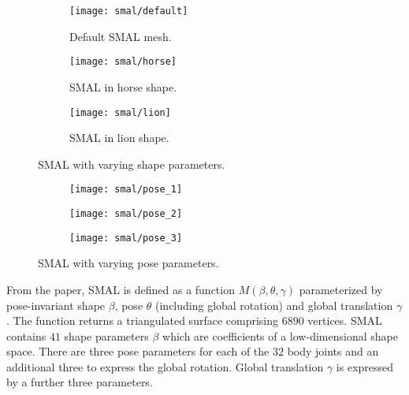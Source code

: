 \begin{figure}[H]
    \centering
    \begin{subfigure}{0.3\linewidth}
    \centering
        \texttt{[image: smal/default]}
        \caption{Default SMAL mesh.}
    \end{subfigure}%
    \begin{subfigure}{0.3\linewidth}
    \centering
        \texttt{[image: smal/horse]}
        \caption{SMAL in horse shape.}
    \end{subfigure}%
    \begin{subfigure}{0.3\linewidth}
        \centering
            \texttt{[image: smal/lion]}
            \caption{SMAL in lion shape.}
    \end{subfigure}%
    \caption{SMAL with varying shape parameters.}
    \label{fig:smal_model_shape}
    \end{figure}

    \begin{figure}[H]
    \centering
    \begin{subfigure}{0.3\linewidth}
    \centering
        \texttt{[image: smal/pose\_1]}
    \end{subfigure}%
    \begin{subfigure}{0.3\linewidth}
    \centering
        \texttt{[image: smal/pose\_2]}
    \end{subfigure}%
    \begin{subfigure}{0.3\linewidth}
        \centering
            \texttt{[image: smal/pose\_3]}
    \end{subfigure}%
    \caption{SMAL with varying pose parameters.}
    \label{fig:smal_model_poses}
\end{figure}

From the paper, SMAL is defined as a function $M(\beta, \theta, \gamma)$ parameterized by pose-invariant shape $\beta$, pose $\theta$ (including global rotation) and global translation $\gamma$. The function returns a triangulated surface comprising $6890$ vertices. SMAL contains $41$ shape parameters $\beta$ which are coefficients of a low-dimensional shape space. There are three pose parameters for each of the $32$ body joints and an additional three to express the global rotation. Global translation $\gamma$ is expressed by a further three parameters.
